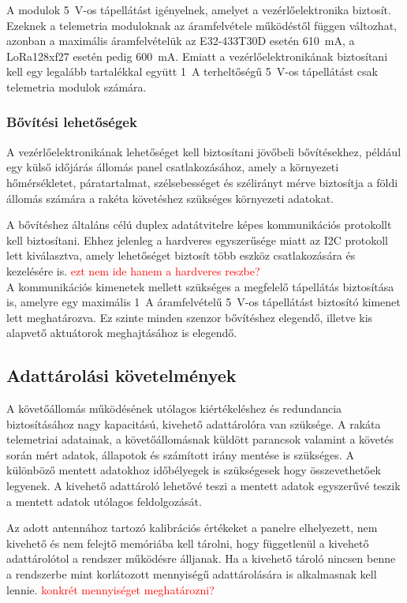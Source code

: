 A modulok 5~V-os tápellátást igényelnek, amelyet a vezérlőelektronika biztosít.
Ezeknek a telemetria moduloknak az áramfelvétele működéstől függen változhat,
azonban a maximális áramfelvételük az E32-433T30D esetén 610~mA, a LoRa128xf27 
esetén pedig 600~mA. 
Emiatt a vezérlőelektronikának biztosítani kell egy legalább tartalékkal együtt
1~A terheltőségű 5~V-os tápellátást csak telemetria modulok számára.

\subsubsection{Bővítési lehetőségek}
\label{subsubsec:req-bovitesi-lehetosegek}
A vezérlőelektronikának lehetőséget kell biztosítani jövőbeli bővítésekhez,
például egy külső időjárás állomás panel csatlakozásához, amely a környezeti hőmérsékletet,
páratartalmat, szélsebességet és szélirányt mérve biztosítja a földi állomás számára a
rakéta követéshez szükséges környezeti adatokat. 

A bővítéshez általáns célú duplex adatátvitelre képes kommunikációs protokollt kell biztosítani.
Ehhez jelenleg a hardveres egyszerűsége miatt az I2C protokoll lett kiválasztva,
amely lehetőséget biztosít több eszköz csatlakozására és kezelésére is. \textcolor{red}{ezt nem 
ide hanem a hardveres reszbe?} \\

A kommunikációs kimenetek mellett szükséges a megfelelő tápellátás biztosítása is,
amelyre egy maximális 1~A áramfelvételű 5~V-os tápellátást biztosító kimenet lett meghatározva.
Ez szinte minden szenzor bővítéshez elegendő, illetve kis alapvető aktuátorok meghajtásához
is elegendő. 

\subsection{Adattárolási követelmények}
\label{subsec:req-adattarolas}
A követőállomás működésének utólagos kiértékeléshez és 
redundancia biztosításához nagy kapacitású, kivehető adattárolóra
van szüksége. A rakáta telemetriai adatainak, a követőállomásnak
küldött parancsok valamint a követés során mért adatok, állapotok és
számított irány mentése is szükséges. A különböző mentett adatokhoz
időbélyegek is szükségesek hogy összevethetőek legyenek.
A kivehető adattároló lehetővé teszi a mentett adatok egyszerűvé
teszik a mentett adatok utólagos feldolgozását.

Az adott antennához tartozó kalibrációs értékeket a panelre elhelyezett,
nem kivehető és nem felejtő memóriába kell tárolni, hogy 
függetlenül a kivehető adattárolótol a rendszer működésre álljanak.
Ha a kivehető tároló nincsen benne a rendszerbe mint korlátozott
mennyiségű adattárolására is alkalmasnak kell lennie.
\textcolor{red}{konkrét mennyiséget meghatározni?}

